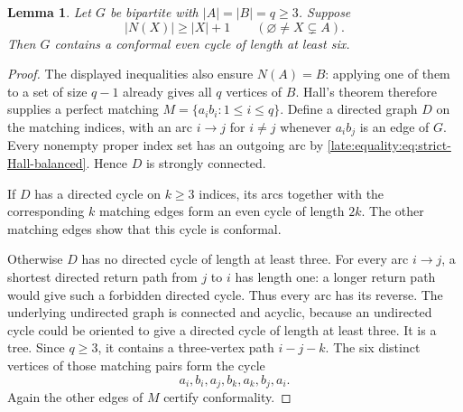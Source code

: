 \documentclass[11pt,a4paper]{article}
\newtheorem{lemma}[theorem]{Lemma}
\theoremstyle{definition}\newtheorem{definition}[theorem]{Definition}
\theoremstyle{remark}\newtheorem{remark}[theorem]{Remark}
\begin{document}
\begin{lemma}\label{late:equality:lem:conformal}
Let $G$ be bipartite with $|A|=|B|=q\ge3$. Suppose
\begin{equation}\label{late:equality:eq:strict-Hall-balanced}
 |N(X)|\ge |X|+1\qquad
 (\varnothing\ne X\subsetneq A).
\end{equation}
Then $G$ contains a conformal even cycle of length at least six.
\end{lemma}
\begin{proof}
The displayed inequalities also ensure $N(A)=B$: applying one of them
to a set of size $q-1$ already gives all $q$ vertices of $B$.
Hall's theorem therefore supplies a perfect matching
$M=\{a_i b_i:1\le i\le q\}$. Define a directed graph $D$ on the matching
indices, with an arc $i\to j$ for $i\ne j$ whenever $a_i b_j$ is an edge
of $G$. Every nonempty proper index set has an outgoing arc by
\eqref{late:equality:eq:strict-Hall-balanced}. Hence $D$ is strongly connected.

If $D$ has a directed cycle on $k\ge3$ indices, its arcs together with
the corresponding $k$ matching edges form an even cycle of length $2k$.
The other matching edges show that this cycle is conformal.

Otherwise $D$ has no directed cycle of length at least three. For every
arc $i\to j$, a shortest directed return path from $j$ to $i$ has length
one: a longer return path would give such a forbidden directed cycle.
Thus every arc has its reverse. The underlying undirected graph is
connected and acyclic, because an undirected cycle could be oriented to
give a directed cycle of length at least three. It is a tree. Since
$q\ge3$, it contains a three-vertex path $i-j-k$. The six distinct
vertices of those matching pairs form the cycle
\[
 a_i,b_i,a_j,b_k,a_k,b_j,a_i.
\]
Again the other edges of $M$ certify conformality.
\end{proof}
\end{document}
